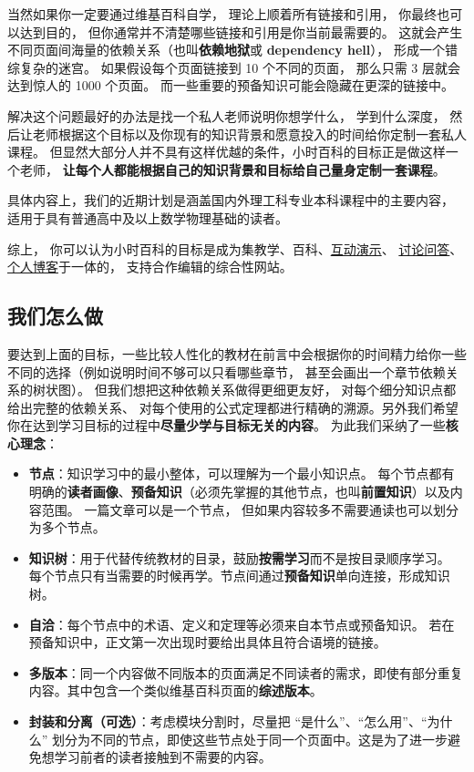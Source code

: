 当然如果你一定要通过维基百科自学， 理论上顺着所有链接和引用， 你最终也可以达到目的， 但你通常并不清楚哪些链接和引用是你当前最需要的。 这就会产生不同页面间海量的依赖关系（也叫\textbf{依赖地狱}或 \textbf{dependency hell}）， 形成一个错综复杂的迷宫。 如果假设每个页面链接到 10 个不同的页面， 那么只需 3 层就会达到惊人的 1000 个页面。 而一些重要的预备知识可能会隐藏在更深的链接中。

解决这个问题最好的办法是找一个私人老师说明你想学什么， 学到什么深度， 然后让老师根据这个目标以及你现有的知识背景和愿意投入的时间给你定制一套私人课程。 但显然大部分人并不具有这样优越的条件，小时百科的目标正是做这样一个老师， \textbf{让每个人都能根据自己的知识背景和目标给自己量身定制一套课程}。

具体内容上，我们的近期计划是涵盖国内外理工科专业本科课程中的主要内容， 适用于具有普通高中及以上数学物理基础的读者。

综上， 你可以认为小时百科的目标是成为集教学、百科、\href{http://wuli.wiki/apps}{互动演示}、 \href{http://wuli.wiki/forum}{讨论问答}、 \href{http://wuli.wiki/note}{个人博客}于一体的， 支持合作编辑的综合性网站。

\subsection{我们怎么做}
要达到上面的目标，一些比较人性化的教材在前言中会根据你的时间精力给你一些不同的选择（例如说明时间不够可以只看哪些章节， 甚至会画出一个章节依赖关系的树状图）。 但我们想把这种依赖关系做得更细更友好， 对每个细分知识点都给出完整的依赖关系、 对每个使用的公式定理都进行精确的溯源。另外我们希望你在达到学习目标的过程中\textbf{尽量少学与目标无关的内容}。 为此我们采纳了一些\textbf{核心理念}：
\begin{itemize}
\item \textbf{节点}：知识学习中的最小整体，可以理解为一个最小知识点。 每个节点都有明确的\textbf{读者画像}、\textbf{预备知识}（必须先掌握的其他节点，也叫\textbf{前置知识}）以及内容范围。 一篇文章可以是一个节点， 但如果内容较多不需要通读也可以划分为多个节点。
\item \textbf{知识树}：用于代替传统教材的目录，鼓励\textbf{按需学习}而不是按目录顺序学习。 每个节点只有当需要的时候再学。节点间通过\textbf{预备知识}单向连接，形成知识树。
\item \textbf{自洽}：每个节点中的术语、定义和定理等必须来自本节点或预备知识。 若在预备知识中，正文第一次出现时要给出具体且符合语境的链接。
\item \textbf{多版本}：同一个内容做不同版本的页面满足不同读者的需求，即使有部分重复内容。其中包含一个类似维基百科页面的\textbf{综述版本}。
\item \textbf{封装和分离（可选）}：考虑模块分割时，尽量把 “是什么”、“怎么用”、“为什么” 划分为不同的节点，即使这些节点处于同一个页面中。这是为了进一步避免想学习前者的读者接触到不需要的内容。
\end{itemize}

